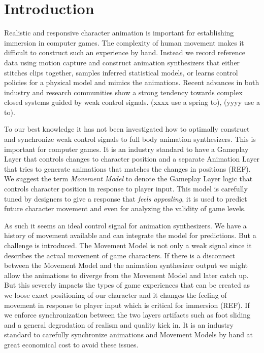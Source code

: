 \section{Introduction}
Realistic and responsive character animation is important for establishing immersion in computer games. The complexity of human movement makes it difficult to construct such an experience by hand. Instead we record reference data using motion capture and construct animation synthesizers that either stitches clips together, samples inferred statistical models, or learns control policies for a physical model and mimics the animations. Recent advances in both industry and research communities show a strong tendency towards complex closed systems guided by weak control signals. (xxxx use a spring to), (yyyy use a to).

To our best knowledge it has not been investigated how to optimally construct and synchronize weak control signals to full body animation synthesizers. This is important for computer games. It is an industry standard to have a Gameplay Layer that controls changes to character position and a separate Animation Layer that tries to generate animations that matches the changes in positions (REF). We suggest the term \textit{Movement Model} to denote the Gameplay Layer logic that controls character position in response to player input. This model is carefully tuned by designers to give a response that \textit{feels appealing}, it is used to predict future character movement and even for analyzing the validity of game levels. 

As such it seems an ideal control signal for animation synthesizers. We have a history of movement available and can integrate the model for predictions. But a challenge is introduced. The Movement Model is not only a weak signal since it describes the actual movement of game characters. If there is a disconnect between the Movement Model and the animation synthesizer output we might allow the animations to diverge from the Movement Model and later catch up. But this severely impacts the types of game experiences that can be created as we loose exact positioning of our character and it changes the feeling of movement in response to player input which is critical for immersion (REF). If we enforce synchronization between the two layers artifacts such as foot sliding and a general degradation of realism and quality kick in. It is an industry standard to carefully synchronize animations and Movement Models by hand at great economical cost to avoid these issues.

